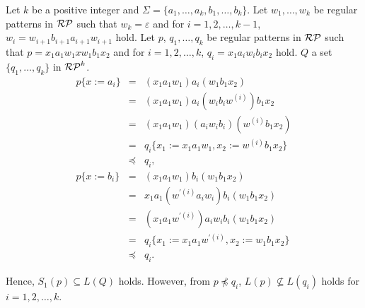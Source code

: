 \begin{ex}\label{counter-example4Theorem10}
    Let $k$ be a positive integer and $\Sigma= \{a_{1},\ldots,a_{k},b_{1},\ldots,b_{k}\}$.
    Let $w_{1},\ldots,w_{k}$ be regular patterns in $\mathcal{RP}$ such that 
    $w_{k} = \varepsilon$ and for $i=1,2,\ldots,k-1$, $w_{i} = w_{i+1}b_{i+1}a_{i+1}w_{i+1}$ hold.
    Let $p$, $q_{1},\ldots,q_{k}$ be regular patterns in $\mathcal{RP}$ such that
    $p = x_{1}a_{1}w_{1}xw_{1}b_{1}x_{2}$ and  for $i=1,2,\ldots,k$, $q_{i} = x_{1}a_{i}w_{i}b_{i}x_{2}$ hold.
    $Q$ a set $\{q_{1},\ldots,q_{k}\}$ in $\mathcal{RP}^{k}$.
    \begin{eqnarray*}
        p \{ x:=a_{i} \} & = & (x_{1}a_{1}w_{1})a_{i}(w_{1}b_{1}x_{2})\\
        & = & (x_{1}a_{1}w_{1})a_{i}(w_{i}b_{i}w^{(i)})b_{1}x_{2}\\
        & = & (x_{1}a_{1}w_{1})(a_{i}w_{i}b_{i})(w^{(i)}b_{1}x_{2})\\
        & = & q_{i} \{ x_{1} := x_{1}a_{1}w_{1}, x_{2} := w^{(i)}b_{1}x_{2} \}\\
        & \preceq & q_{i},\\
        p \{ x:=b_{i} \} & = & (x_{1}a_{1}w_{1})b_{i}(w_{1}b_{1}x_{2})\\
        & = & x_{1}a_{1}(w^{\prime (i)}a_{i}w_{i})b_{i}(w_{1}b_{1}x_{2}) \\
        & = & (x_{1}a_{1}w^{\prime (i)})a_{i}w_{i}b_{i}(w_{1}b_{1}x_{2}) \\
        & = & q_{i} \{ x_{1} := x_{1}a_{1}w^{\prime (i)}, x_{2} := w_{1}b_{1}x_{2} \}\\
        & \preceq & q_{i}.
    \end{eqnarray*}

   Hence, $S_{1}(p) \subseteq L(Q)$ holds.
   However, from $p \not \preceq q_{i}$, $L(p) \not \subseteq L(q_{i})$ holds for $i=1,2,\ldots,k$.
\end{ex}
